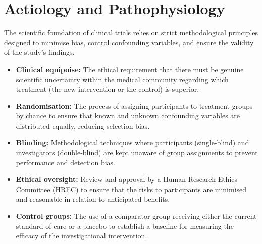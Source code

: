 \section*{Aetiology and Pathophysiology}
The scientific foundation of clinical trials relies on strict methodological principles designed to minimise bias, control confounding variables, and ensure the validity of the study's findings.
\begin{itemize}
    \item \textbf{Clinical equipoise:} The ethical requirement that there must be genuine scientific uncertainty within the medical community regarding which treatment (the new intervention or the control) is superior.
    \item \textbf{Randomisation:} The process of assigning participants to treatment groups by chance to ensure that known and unknown confounding variables are distributed equally, reducing selection bias.
    \item \textbf{Blinding:} Methodological techniques where participants (single-blind) and investigators (double-blind) are kept unaware of group assignments to prevent performance and detection bias.
    \item \textbf{Ethical oversight:} Review and approval by a Human Research Ethics Committee (HREC) to ensure that the risks to participants are minimised and reasonable in relation to anticipated benefits.
    \item \textbf{Control groups:} The use of a comparator group receiving either the current standard of care or a placebo to establish a baseline for measuring the efficacy of the investigational intervention.
\end{itemize}

